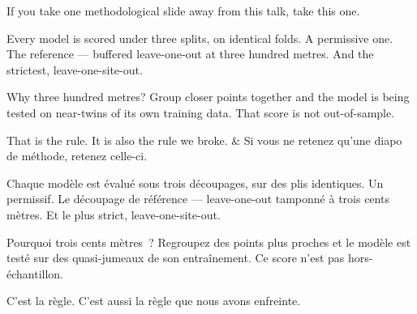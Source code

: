 \documentclass[10pt,a4paper]{article}
\begin{document}
\begin{say}
If you take one methodological slide away from this talk, take this one.

Every model is scored under three splits, on identical folds. A permissive one.
The reference --- buffered leave-one-out at three hundred metres. And the
strictest, leave-one-site-out.

Why three hundred metres?  Group closer points together and the model is being tested
on near-twins of its own training data. That score is not out-of-sample.

 That is the rule. It is also the
rule we broke.
&
Si vous ne retenez qu'une diapo de méthode, retenez celle-ci.

Chaque modèle est évalué sous trois découpages, sur des plis identiques. Un
permissif. Le découpage de référence --- leave-one-out tamponné à trois cents
mètres. Et le plus strict, leave-one-site-out.

Pourquoi trois cents mètres~?  Regroupez des points plus proches et le
modèle est testé sur des quasi-jumeaux de son entraînement. Ce score n'est pas
hors-échantillon.

 C'est la règle. C'est aussi
la règle que nous avons enfreinte.
\end{say}

\clearpage
\end{document}
